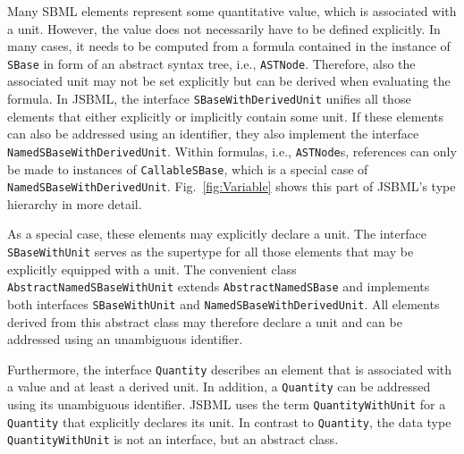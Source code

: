 Many SBML elements represent some quantitative value, which is associated with a
unit. However, the value does not necessarily have to be defined explicitly. In
many cases, it needs to be computed from a formula contained in the instance of
\texttt{SBase} in form of an abstract syntax tree, i.e., \texttt{ASTNode}.
%
Therefore, also the associated unit may not be set explicitly but can be derived
when evaluating the formula. In JSBML, the interface
\texttt{SBaseWithDerivedUnit}
%
unifies all those elements
that either explicitly or implicitly contain some unit. If these elements can
also be addressed using an identifier, they also implement the interface
\texttt{NamedSBaseWithDerivedUnit}.
%
Within formulas, i.e., \texttt{ASTNode}s,
references can only be made to instances of \texttt{CallableSBase},
%
which is a special case of \texttt{NamedSBaseWithDerivedUnit}.
Fig.~\vref{fig:Variable} shows this part of JSBML's type hierarchy in more
detail.

As a special case, these elements may explicitly declare a unit. The interface
\texttt{SBaseWithUnit}
%
serves as the supertype for all those elements that may
be explicitly equipped with a unit. The convenient class
\texttt{AbstractNamedSBaseWithUnit}
%
%
extends \texttt{AbstractNamedSBase} and
implements both interfaces \texttt{SBaseWithUnit} and
%
\texttt{NamedSBaseWithDerivedUnit}.
%
All elements derived from this abstract class may therefore declare a unit and
can be addressed using an unambiguous identifier.

Furthermore, the interface \texttt{Quantity}
%
describes an element that is associated with a value and at least a derived
unit. In addition, a \texttt{Quantity} can be addressed
using its unambiguous identifier. JSBML uses the term \texttt{QuantityWithUnit}
for a \texttt{Quantity} that explicitly declares its unit. In contrast to
\texttt{Quantity}, the data type \texttt{QuantityWithUnit}
%
is not an interface, but an abstract class.

